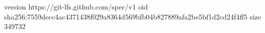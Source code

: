 version https://git-lfs.github.com/spec/v1
oid sha256:7559decc4ac4371438f029a8364d569bfb04b827889afa2be5bf1d2cd24f4ff5
size 349732
